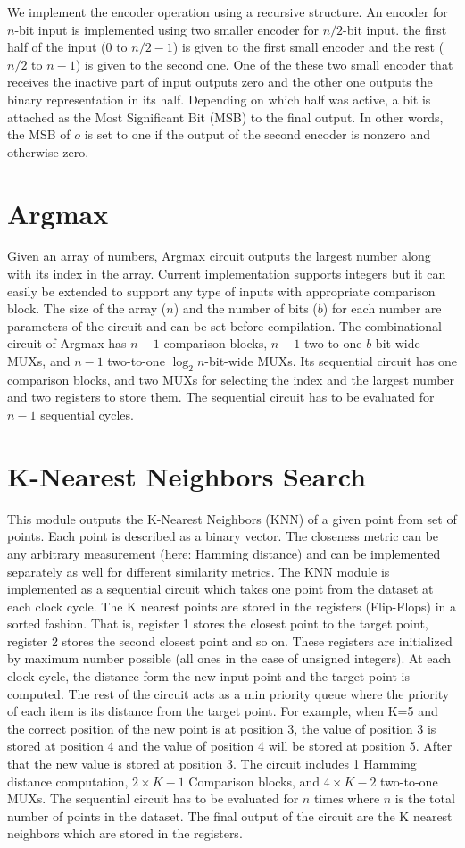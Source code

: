 We implement the encoder operation using a recursive structure.
An encoder for $n$-bit input is implemented using two smaller encoder for $n/2$-bit input.
the first half of the input ($0$ to $n/2-1$) is given to the first small encoder and the rest ($n/2$ to $n-1$) is given to the second one.
One of the these two small encoder that receives the inactive part of input outputs zero and the other one outputs the binary representation in its half.
Depending on which half was active, a bit is attached as the Most Significant Bit (MSB) to the final output.
In other words, the MSB of $o$ is set to one if the output of the second encoder is nonzero and otherwise zero.

\section{Argmax}
Given an array of numbers, Argmax circuit outputs the largest number along with its index in the array.
Current implementation supports integers but it can easily be extended to support any type of inputs with appropriate comparison block.
The size of the array ($n$) and the number of bits ($b$) for each number are parameters of the circuit and can be set before compilation.
The combinational circuit of Argmax has $n-1$ comparison blocks, $n-1$ two-to-one $b$-bit-wide MUXs, and $n-1$ two-to-one $\log_2{n}$-bit-wide MUXs.
Its sequential circuit has one comparison blocks, and two MUXs for selecting the index and the largest number and two registers to store them.
The sequential circuit has to be evaluated for $n-1$ sequential cycles.

\section{K-Nearest Neighbors Search}
This module outputs the K-Nearest Neighbors (KNN) of a given point from set of points.
Each point is described as a binary vector.
The closeness metric can be any arbitrary measurement (here: Hamming distance) and can be implemented separately as well for different similarity metrics.
The KNN module is implemented as a sequential circuit which takes one point from the dataset at each clock cycle.
The K nearest points are stored in the registers (Flip-Flops) in a sorted fashion.
That is, register 1 stores the closest point to the target point, register 2 stores the second closest point and so on.
These registers are initialized by maximum number possible (all ones in the case of unsigned integers).
At each clock cycle, the distance form the new input point and the target point is computed.
The rest of the circuit acts as a min priority queue where the priority of each item is its distance from the target point.
For example, when K=5 and the correct position of the new point is at position 3, the value of position 3 is stored at position 4 and the value of position 4 will be stored at position 5.
After that the new value is stored at position 3.
The circuit includes 1 Hamming distance computation, $2\times K-1$ Comparison blocks, and $4\times K-2$ two-to-one MUXs.
The sequential circuit has to be evaluated for $n$ times where $n$ is the total number of points in the dataset.
The final output of the circuit are the K nearest neighbors which are stored in the registers.

